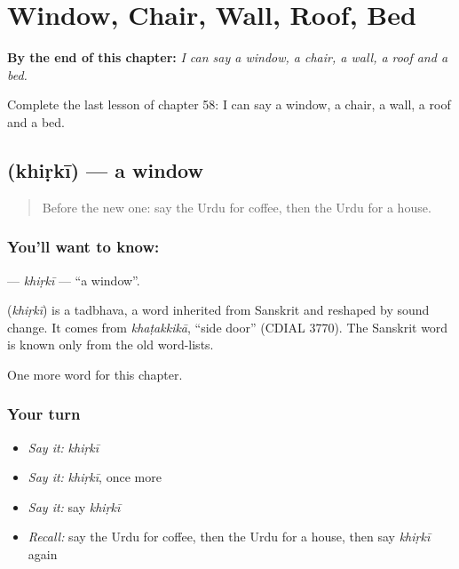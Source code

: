 
\chapter{Window, Chair, Wall, Roof, Bed}
\label{ch:ur-window-chair-wall-roof-bed}

\begin{chapteropening}
\textbf{By the end of this chapter:} \emph{I can say a window, a chair, a wall, a roof and a bed.}

Complete the last lesson of chapter 58: I can say a window, a chair, a wall, a roof and a bed.
\end{chapteropening}

\section[\texorpdfstring{\ur{کھڑکی} (khiṛkī)}{کھڑکی (khiṛkī)}]{ (khiṛkī) — a window}

\label{lesson:UR-C58-khirki}



\begin{quote}
Before the new one: say the Urdu for coffee, then the Urdu for a house.
\end{quote}

\subsection*{You'll want to know: }
\textbf{} — \emph{khiṛkī} — \textquotedblleft{}a window\textquotedblright{}.

\begin{cousinweb}
\textbf{} (\emph{khiṛkī}) is a tadbhava, a word inherited from Sanskrit and reshaped by sound change. It comes from \emph{khaṭakkikā}, \textquotedblleft{}side door\textquotedblright{} (CDIAL 3770). The Sanskrit word is known only from the old word-lists.
\end{cousinweb}

\begin{grammarlens}[title={What you've built}]
One more word for this chapter.
\end{grammarlens}

\subsection*{Your turn}
\begin{itemize}
\raggedright
  \item \emph{Say it:} \emph{khiṛkī}
  \item \emph{Say it:} \emph{khiṛkī}, once more
  \item \emph{Say it:} say \emph{khiṛkī}
  \item \emph{Recall:} say the Urdu for coffee, then the Urdu for a house, then say \emph{khiṛkī} again
\end{itemize}

